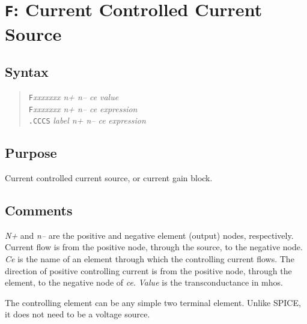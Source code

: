 %
%
%
%
\section{{\tt F}: Current Controlled Current Source}
\subsection{Syntax}
\begin{verse}
{\tt F}{\it xxxxxxx n+ n-- ce} {\it value}\\
{\tt F}{\it xxxxxxx n+ n-- ce} {\it expression}\\
{\tt .CCCS} {\it label n+ n-- ce} {\it expression}
\end{verse}
\subsection{Purpose}

Current controlled current source, or current gain block.
\subsection{Comments}

{\it N+} and {\it n--} are the positive and negative element (output)
nodes, respectively.  Current flow is from the positive node,
through the source, to the negative node.  {\it Ce} is the name of
an element through which the controlling current flows.  The
direction of positive controlling current is from the positive
node, through the element, to the negative node of {\it ce}.  {\it
Value} is the transconductance in mhos.

The controlling element can be any simple two terminal element.
Unlike SPICE, it does not need to be a voltage source.
